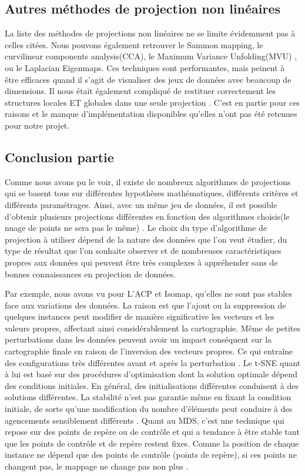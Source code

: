 \subsection{Autres méthodes de projection non linéaires}
La liste des méthodes de projections non linéaires ne se limite évidemment pas à celles citées.
Nous pouvons également retrouver le Sammon mapping\cite{sammon1969nonlinear}, le curvilinear components analysis(CCA)\cite{demartines1997curvilinearCCA}, le Maximum Variance Unfolding(MVU)\cite{weinberger2006MVU1} \cite{song2007MVU2}, ou le Laplacian Eigenmaps\cite{saul2000introduction}. 
Ces techniques sont performantes, mais peinent à être efficaces quand il s’agit de visualiser des jeux de données avec beaucoup de dimensions. Il nous était également compliqué de restituer correctement les structures locales ET globales dans une seule projection\cite{belkin2002semi} \cite{van2008TSNE}.
C’est en partie pour ces raisons et le manque d'implémentation disponibles qu'elles n’ont pas été retenues pour notre projet.
\smallskip


\subsection{Conclusion partie}
Comme nous avons pu le voir, il existe de nombreux algorithmes de projections qui se basent tous sur différentes hypothèses mathématiques, différents critères et différents paramétrages. Ainsi, avec un même jeu de données, il est possible d'obtenir plusieurs projections différentes en fonction des algorithmes choisis(le nuage de points ne sera pas le même) . 
Le choix du type d’algorithme de projection à utiliser dépend de la nature des données que l’on veut étudier, du type de résultat que l’on souhaite observer et de nombreuses caractéristiques propres aux données qui peuvent être très complexes à appréhender sans de bonnes connaissances en projection de données.

Par exemple, nous avons vu pour L’ACP et Isomap, qu'elles ne sont pas stables face aux variations des données. La raison est que l'ajout ou la suppression de quelques instances peut modifier de manière significative les vecteurs et les valeurs propres, affectant ainsi considérablement la cartographie. Même de petites perturbations dans les données peuvent avoir un impact conséquent sur la cartographie finale en raison de l'inversion des vecteurs propres. Ce qui entraîne des configurations très différentes avant et après la perturbation \cite{nonato2018multidimensional}.
Le t-SNE quant à lui est basé sur des procédures d'optimisation dont la solution optimale dépend des conditions initiales. En général, des initialisations différentes conduisent à des solutions différentes. La stabilité n'est pas garantie même en fixant la condition initiale, de sorte qu'une modification du nombre d'éléments peut conduire à des agencements sensiblement différents \cite{garcia2013stability}.
Quant au MDS, c'est une technique qui repose sur des points de repère ou de contrôle et qui a tendance à être stable tant que les points de contrôle et de repère restent fixes. Comme la position de chaque instance ne dépend que des points de contrôle (points de repère), si ces points ne changent pas, le mappage ne change pas non plus \cite{garcia2013stability}.


